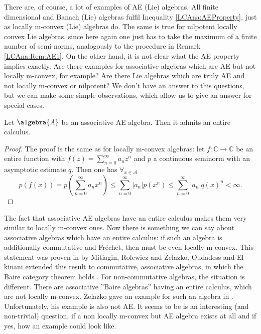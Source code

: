 There are, of course, a lot of examples of AE (Lie) algebras. 
All finite dimensional and Banach (Lie) algebras fulfil Inequality
\eqref{LCAna:AEProperty}, just as locally m-convex (Lie) algebras do. 
The same is true for nilpotent locally convex Lie algebras, 
since here again one just has to take the maximum of a finite 
number of semi-norms, analogously to the procedure in Remark 
\ref{LCAna:Rem:AE1}. On the other hand, it is not clear what the AE property 
implies exactly. Are there examples for associative algebras which are AE but 
not locally m-convex, for example? Are there Lie algebras which are truly AE 
and not locally m-convex or nilpotent? We don't have an answer to this 
questions, but we can make some simple observations, which allow us to give an 
answer for special cases.
\begin{proposition}
	Let $\algebra{A}$ be an associative AE algebra. Then it admits an
	entire calculus.
\end{proposition}
\begin{proof}
	The proof is the same as for locally m-convex algebras: let 
	$f \colon \mathbb{C} \longrightarrow \mathbb{C}$ be an entire 
	function with $f(z) = \sum_{n=0}^{\infty} a_n z^n$ and $p$
	a continuous seminorm with an asymptotic estimate $q$.
	Then one has $\forall_{x \in \mathcal{A}}$
	\begin{equation*}
		p(f(x))
		=
		p \left(
			\sum\limits_{n=0}^{\infty}
			a_n x^n
		\right)
		\leq
		\sum\limits_{n=0}^{\infty}
		|a_n| 
		p \left( x^n \right)
		\leq
		\sum\limits_{n=0}^{\infty}
		|a_n| q(x)^n
		<
		\infty.
	\end{equation*}
\end{proof}
\begin{remark}
	The fact that associative AE algebras have an entire calculus makes them 
	very similar to locally m-convex ones.
	Now there is something we can say about associative algebras which have an 
	entire calculus: if such an algebra is additionally commutative and 
	Fr\'echet, then must be even locally m-convex. This statement was proven 
	in \cite{mitiagin.rolewicz.zelazko:1962a} by Mitiagin, Rolewicz and 
	{\.Z}elazko. Oudadess and El kinani extended this result to commutative, 
	associative algebras, in which the Baire category theorem holds 
	\cite{elkinani.oudadess:1997a}. For non-commutative algebras, the 
	situation is different. There are associative ''Baire algebras'' having an 
	entire calculus, which are not locally m-convex. {\.Z}elazko gave an 
	example for such an algebra in \cite{zelazko:1994a}. Unfortunately, his 
	example is also not AE. It seems to be is an interesting (and non-trivial) 
	question, if a non locally m-convex but AE algebra exists at all and if 
	yes, how an example could look like.
\end{remark}



